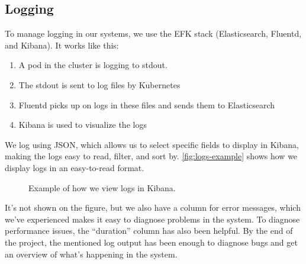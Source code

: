 \subsection{Logging}
To manage logging in our systems, we use the EFK stack (Elasticsearch, Fluentd, and Kibana). It works like this:
\begin{enumerate}
  \item A pod in the cluster is logging to stdout.
  \item The stdout is sent to log files by Kubernetes
  \item Fluentd picks up on logs in these files and sends them to Elasticsearch
  \item Kibana is used to visualize the logs
\end{enumerate}
We log using JSON, which allows us to select specific fields to display in Kibana, making the logs easy to read, filter, and sort by. \autoref{fig:logs-example} shows how we display logs in an easy-to-read format.
\begin{figure}[H]
  \caption{Example of how we view logs in Kibana.}
  \label{fig:logs-example}
\end{figure}
It's not shown on the figure, but we also have a column for error messages, which we've experienced makes it easy to diagnose problems in the system. To diagnose performance issues, the ``duration'' column has also been helpful. By the end of the project, the mentioned log output has been enough to diagnose bugs and get an overview of what's happening in the system.
